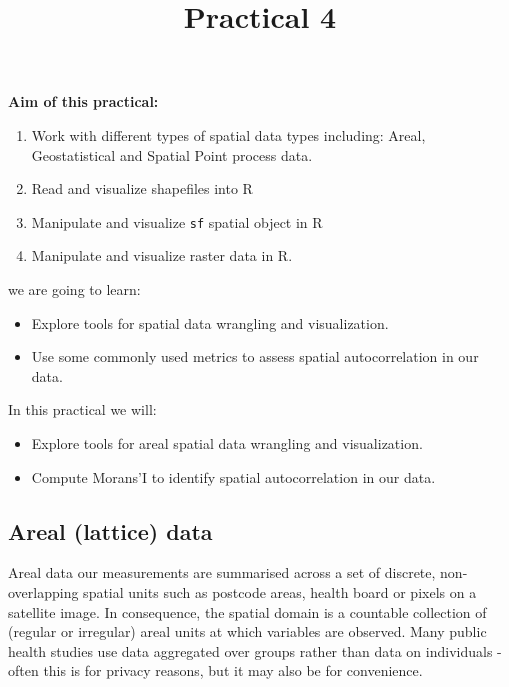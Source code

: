 \documentclass[
  letterpaper,
  DIV=11,
  numbers=noendperiod]{scrartcl}
\title{Practical 4}
\author{}
\date{}
\makeatletter
\providecommand{\tightlist}{%
  \setlength{\itemsep}{0pt}\setlength{\parskip}{0pt}}\usepackage{longtable,booktabs,array}
\renewcommand{\maketitle}{\bgroup\setlength{\parindent}{0pt}
\begin{flushleft}
  {\sffamily\huge\textbf{\MakeUppercase{\@title}}} \vspace{0.3cm} \newline
  {\Large {\@subtitle}} \newline
  \@author
\end{flushleft}\egroup
}
\makeatother
\begin{document}
\maketitle

\pagestyle{mystyle}


\textbf{Aim of this practical:}

\begin{enumerate}
\def\labelenumi{\arabic{enumi}.}
\tightlist
\item
  Work with different types of spatial data types including: Areal,
  Geostatistical and Spatial Point process data.
\item
  Read and visualize shapefiles into R
\item
  Manipulate and visualize \texttt{sf} spatial object in R
\item
  Manipulate and visualize raster data in R.
\end{enumerate}

we are going to learn:

\begin{itemize}
\tightlist
\item
  Explore tools for spatial data wrangling and visualization.
\item
  Use some commonly used metrics to assess spatial autocorrelation in
  our data.
\end{itemize}

In this practical we will:

\begin{itemize}
\tightlist
\item
  Explore tools for areal spatial data wrangling and visualization.
\item
  Compute Morans'I to identify spatial autocorrelation in our data.
\end{itemize}

\subsection{Areal (lattice) data}\label{sec-areal_data}

Areal data our measurements are summarised across a set of discrete,
non-overlapping spatial units such as postcode areas, health board or
pixels on a satellite image. In consequence, the spatial domain is a
countable collection of (regular or irregular) areal units at which
variables are observed. Many public health studies use data aggregated
over groups rather than data on individuals - often this is for privacy
reasons, but it may also be for convenience.
\end{document}
